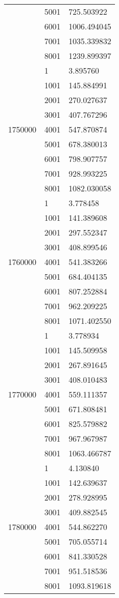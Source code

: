 \begin{table}[htb!]
\begin{tabular}{lll}
 & 5001 & 725.503922 \\
 & 6001 & 1006.494045 \\
 & 7001 & 1035.339832 \\
 & 8001 & 1239.899397 \\
\multirow[c]{9}{*}{1750000} & 1 & 3.895760 \\
 & 1001 & 145.884991 \\
 & 2001 & 270.027637 \\
 & 3001 & 407.767296 \\
 & 4001 & 547.870874 \\
 & 5001 & 678.380013 \\
 & 6001 & 798.907757 \\
 & 7001 & 928.993225 \\
 & 8001 & 1082.030058 \\
\multirow[c]{9}{*}{1760000} & 1 & 3.778458 \\
 & 1001 & 141.389608 \\
 & 2001 & 297.552347 \\
 & 3001 & 408.899546 \\
 & 4001 & 541.383266 \\
 & 5001 & 684.404135 \\
 & 6001 & 807.252884 \\
 & 7001 & 962.209225 \\
 & 8001 & 1071.402550 \\
\multirow[c]{9}{*}{1770000} & 1 & 3.778934 \\
 & 1001 & 145.509958 \\
 & 2001 & 267.891645 \\
 & 3001 & 408.010483 \\
 & 4001 & 559.111357 \\
 & 5001 & 671.808481 \\
 & 6001 & 825.579882 \\
 & 7001 & 967.967987 \\
 & 8001 & 1063.466787 \\
\multirow[c]{9}{*}{1780000} & 1 & 4.130840 \\
 & 1001 & 142.639637 \\
 & 2001 & 278.928995 \\
 & 3001 & 409.882545 \\
 & 4001 & 544.862270 \\
 & 5001 & 705.055714 \\
 & 6001 & 841.330528 \\
 & 7001 & 951.518536 \\
 & 8001 & 1093.819618 \\

\end{tabular}
\end{table}
